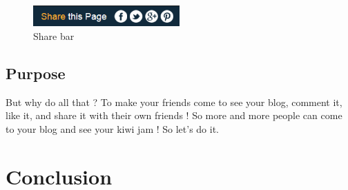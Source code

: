 \documentclass[a4paper,10pt]{article}
\begin{document}
\begin{figure}[h]
    \center
  \includegraphics[width=0.5\textwidth]{Images/blogBar.png}
    \caption{Share bar}
\end{figure}

\subsection{Purpose}

But why do all that ? To make your friends come to see your blog, comment it, like it, and share it with their own friends ! So more and more people can come to your blog and see your kiwi jam ! So let's do it.

 


\newpage
\section{Conclusion}
\end{document}
